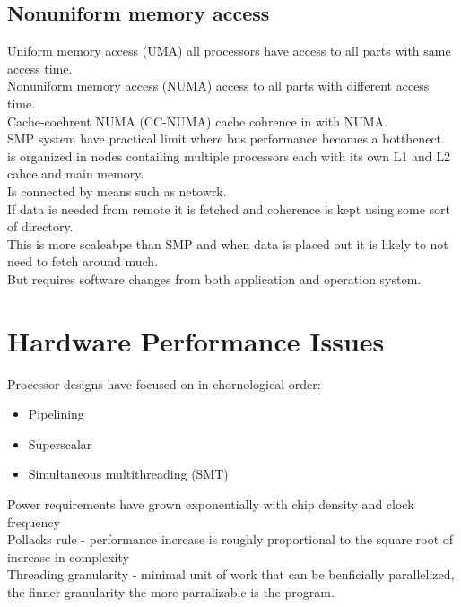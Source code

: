 \documentclass[12pt, a4paper]{article}
\begin{document}
		\subsection{Nonuniform memory access}
			Uniform memory access (UMA) all processors have access to all parts with same access time.\\
			Nonuniform memory access (NUMA) access to all parts with different access time.\\
			Cache-coehrent NUMA (CC-NUMA) cache cohrence in with NUMA.\\
			SMP system have practical limit where bus performance becomes a botthenect.\\
			is organized in nodes contailing multiple processors each with its own L1 and L2 cahce and main memory.\\
			Is connected by means such as netowrk.\\
			If data is needed from remote it is fetched and coherence is kept using some sort of directory.\\
			This is more scaleabpe than SMP and when data is placed out it is likely to not need to fetch around much.\\
			But requires software changes from both application and operation system.
	\section{Hardware Performance Issues}
		Processor designs have focused on in chornological order:
		\begin{itemize}
			\item Pipelining
			\item Superscalar
			\item Simultaneous multithreading (SMT)
		\end{itemize}
		Power requirements have grown exponentially with chip density and clock frequency\\
		Pollacks rule - performance increase is roughly proportional to the square root of increase in complexity\\
		Threading granularity - minimal unit of work that can be benficially parallelized, the finner granularity the more parralizable is the program.\\
\end{document}

